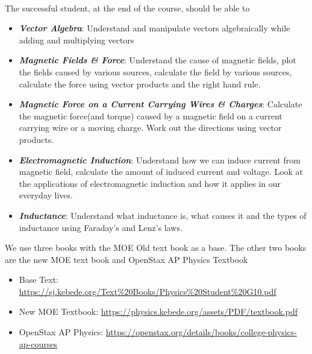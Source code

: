 \documentclass[11pt]{article}
\begin{document}
\medskip{}\\
The successful student, at the end of the course, should be able to
\begin{itemize}
	\item\textbf{\emph{Vector Algebra}}:  Understand and manipulate vectors algebraically while adding and multiplying vectors\vspace{-.1in}
	\item\textbf{\emph{Magnetic Fields \& Force}}: Understand the cause of magnetic fields, plot the fields caused by various sources, calculate the field by various sources, calculate the force using vector products and the right hand rule.\vspace{-.1in}
	\item\textbf{\emph{Magnetic Force on a Current Carrying Wires \& Charges}}:  Calculate the magnetic force(and torque) caused by a magnetic field on a current carrying wire or a moving charge. Work out the directions using vector products.\vspace{-.1in}
	\item\textbf{\emph{Electromagnetic Induction}}:  Understand how we can induce current from magnetic field, calculate the amount of induced current and voltage. Look at the applications of electromagnetic induction and how it applies in our everyday lives.\vspace{-.1in}
	\item\textbf{\emph{Inductance}}:  Understand what inductance is, what causes it and the types of inductance using Faraday's and Lenz's laws.
\end{itemize}

 We use three books with the MOE Old text book as a base. The other two books are the new MOE text book and OpenStax AP Physics Textbook
\begin{itemize}
	\item Base Text: \url{https://sj.kebede.org/Text%20Books/Physics%20Student%20G10.pdf}
	\item New MOE Textbook: \url{https://physics.kebede.org/assets/PDF/textbook.pdf}
	\item OpenStax AP Physics: \url{https://openstax.org/details/books/college-physics-ap-courses}
\end{itemize}

\newpage
\medskip{}
\end{document}
